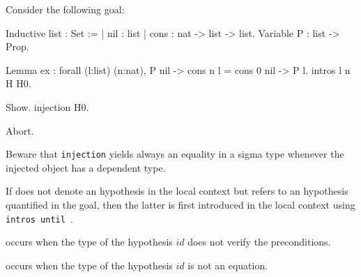 \Example Consider the following goal:

\begin{coq_example*}
Inductive list : Set :=
  | nil : list
  | cons : nat -> list -> list.
Variable P : list -> Prop.
\end{coq_example*}
\begin{coq_eval}
Lemma ex :
 forall (l:list) (n:nat), P nil -> cons n l = cons 0 nil -> P l.
intros l n H H0.
\end{coq_eval}
\begin{coq_example}
Show.
injection H0.
\end{coq_example}
\begin{coq_eval}
Abort.
\end{coq_eval}

Beware that \texttt{injection} yields always an equality in a sigma type
whenever the injected object has a dependent type.

\Rem If {\ident} does not denote an hypothesis in the local context
but refers to an hypothesis quantified in the goal, then the
latter is first introduced in the local context using
\texttt{intros until \ident}.

\begin{ErrMsgs}
\item {\ident}  
  occurs when the type of
  the hypothesis $id$ does not verify the preconditions.
\item {} occurs when the type of the
  hypothesis $id$ is not an equation.
\end{ErrMsgs}


